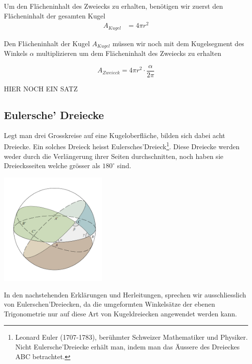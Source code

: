 \begin{refsection}
Um den Flächeninhalt des Zweiecks zu erhalten, benötigen wir zuerst den Flächeninhalt der gesamten Kugel
\begin{align*}
A_{ Kugel } &= 4 \pi r^{2}
\end{align*}

Den Flächeninhalt der Kugel $A_{ Kugel }$ müssen wir noch mit dem Kugelsegment des Winkels $\alpha$ multiplizieren um dem Flächeninhalt des Zweiecks zu erhalten

\begin{equation}
A_{ Zweieck } = 4 \pi r^{2} \cdot \frac{ \alpha }{ 2 \pi }
\end{equation}

HIER NOCH EIN SATZ

\subsection{Eulersche’ Dreiecke}

Legt man drei Grosskreise auf eine Kugeloberfläche, bilden sich dabei acht Dreiecke. 
Ein solches Dreieck heisst Eulersches’Dreieck\footnote{%
Leonard Euler (1707-1783), berühmter Schweizer Mathematiker und Physiker. 
Nicht Eulersche’Dreiecke erhält man, indem man das Äussere des Dreieckes ABC betrachtet.}.
Diese Dreiecke werden weder durch die Verlängerung ihrer Seiten durchschnitten, 
noch haben sie Dreiecksseiten welche grösser als $180^{\circ}$ sind.

\begin{center}
        \includegraphics[width=0.4\textwidth]{kugel/Zweiecke.jpg}
\end{center}

In den nachstehenden Erklärungen und Herleitungen, sprechen wir ausschliesslich von Eulerschen’Dreiecken, da die umgeformten Winkelsätze der ebenen Trigonometrie nur auf diese Art von Kugeldreiecken angewendet werden kann.


\end{refsection}
